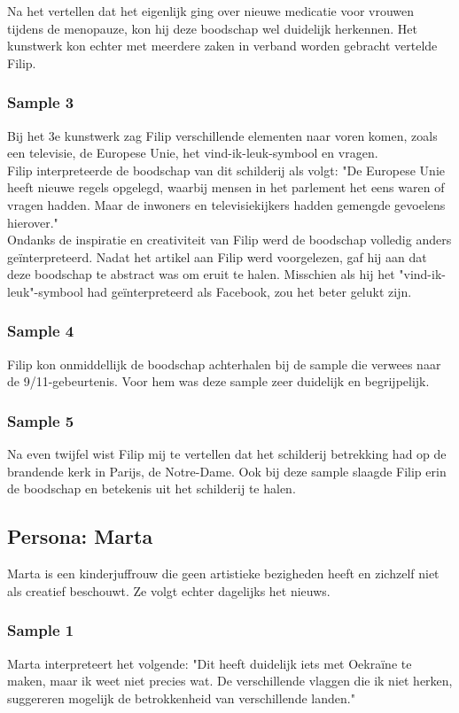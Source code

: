 Na het vertellen dat het eigenlijk ging over nieuwe medicatie voor vrouwen tijdens de menopauze, kon hij deze boodschap wel duidelijk herkennen. Het kunstwerk kon echter met meerdere zaken in verband worden gebracht vertelde Filip.

\subsubsection{Sample 3}
Bij het 3e kunstwerk zag Filip verschillende elementen naar voren komen, zoals een televisie, de Europese Unie, het vind-ik-leuk-symbool en vragen. \\

Filip interpreteerde de boodschap van dit schilderij als volgt: "De Europese Unie heeft nieuwe regels opgelegd, waarbij mensen in het parlement het eens waren of vragen hadden. Maar de inwoners en televisiekijkers hadden gemengde gevoelens hierover." \\

Ondanks de inspiratie en creativiteit van Filip werd de boodschap volledig anders geïnterpreteerd. Nadat het artikel aan Filip werd voorgelezen, gaf hij aan dat deze boodschap te abstract was om eruit te halen. Misschien als hij het "vind-ik-leuk"-symbool had geïnterpreteerd als Facebook, zou het beter gelukt zijn.

\subsubsection{Sample 4}
Filip kon onmiddellijk de boodschap achterhalen bij de sample die verwees naar de 9/11-gebeurtenis. Voor hem was deze sample zeer duidelijk en begrijpelijk.

\subsubsection{Sample 5}
Na even twijfel wist Filip mij te vertellen dat het schilderij betrekking had op de brandende kerk in Parijs, de Notre-Dame. Ook bij deze sample slaagde Filip erin de boodschap en betekenis uit het schilderij te halen.


\subsection{Persona: Marta}
Marta is een kinderjuffrouw die geen artistieke bezigheden heeft en zichzelf niet als creatief beschouwt. Ze volgt echter dagelijks het nieuws.

\subsubsection{Sample 1}
Marta interpreteert het volgende: "Dit heeft duidelijk iets met Oekraïne te maken, maar ik weet niet precies wat. De verschillende vlaggen die ik niet herken, suggereren mogelijk de betrokkenheid van verschillende landen." \\

